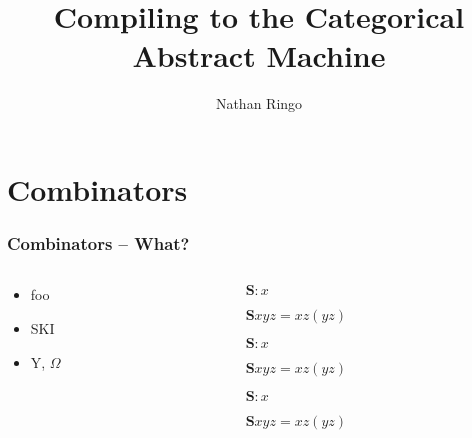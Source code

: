 \documentclass{beamer}
\title{Compiling to the Categorical Abstract Machine}
\author{Nathan Ringo}
\def\S{\textbf{S}}
\begin{document}
\frame{\titlepage}

\section{Combinators}

\begin{frame}
	\frametitle{Combinators -- What?}
	\begin{columns}[T]
	\begin{column}[T]{5cm}
		\begin{itemize}
			\item<1-> foo
			\item<2-> SKI
			\item<5-> Y, $\Omega$
		\end{itemize}
	\end{column}
	\begin{column}[T]{5cm}
		\begin{description}
			\item<2->{$\S : x$}
			\item<2->{$\S xyz = xz\left(yz\right)$}
			\item<3->{$\S : x$}
			\item<3->{$\S xyz = xz\left(yz\right)$}
			\item<4->{$\S : x$}
			\item<4->{$\S xyz = xz\left(yz\right)$}
		\end{description}
	\end{column}
	\end{columns}
\end{frame}
\end{document}
